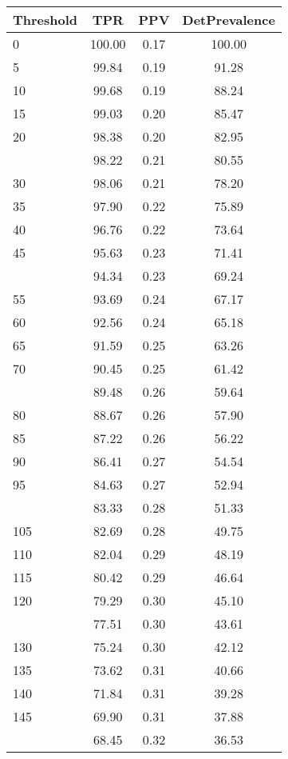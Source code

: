 \begin{table}[ht]
\centering
\begin{tabular}{lccc}
  \toprule
Threshold & TPR & PPV & DetPrevalence \\ 
  \midrule
0 & 100.00 & 0.17 & 100.00 \\ 
  5 & 99.84 & 0.19 & 91.28 \\ 
  10 & 99.68 & 0.19 & 88.24 \\ 
  15 & 99.03 & 0.20 & 85.47 \\ 
  20 & 98.38 & 0.20 & 82.95 \\ 
   \addlinespace
25 & 98.22 & 0.21 & 80.55 \\ 
  30 & 98.06 & 0.21 & 78.20 \\ 
  35 & 97.90 & 0.22 & 75.89 \\ 
  40 & 96.76 & 0.22 & 73.64 \\ 
  45 & 95.63 & 0.23 & 71.41 \\ 
   \addlinespace
50 & 94.34 & 0.23 & 69.24 \\ 
  55 & 93.69 & 0.24 & 67.17 \\ 
  60 & 92.56 & 0.24 & 65.18 \\ 
  65 & 91.59 & 0.25 & 63.26 \\ 
  70 & 90.45 & 0.25 & 61.42 \\ 
   \addlinespace
75 & 89.48 & 0.26 & 59.64 \\ 
  80 & 88.67 & 0.26 & 57.90 \\ 
  85 & 87.22 & 0.26 & 56.22 \\ 
  90 & 86.41 & 0.27 & 54.54 \\ 
  95 & 84.63 & 0.27 & 52.94 \\ 
   \addlinespace
100 & 83.33 & 0.28 & 51.33 \\ 
  105 & 82.69 & 0.28 & 49.75 \\ 
  110 & 82.04 & 0.29 & 48.19 \\ 
  115 & 80.42 & 0.29 & 46.64 \\ 
  120 & 79.29 & 0.30 & 45.10 \\ 
   \addlinespace
125 & 77.51 & 0.30 & 43.61 \\ 
  130 & 75.24 & 0.30 & 42.12 \\ 
  135 & 73.62 & 0.31 & 40.66 \\ 
  140 & 71.84 & 0.31 & 39.28 \\ 
  145 & 69.90 & 0.31 & 37.88 \\ 
   \addlinespace
150 & 68.45 & 0.32 & 36.53 \\ 

\end{tabular}
\end{table}

